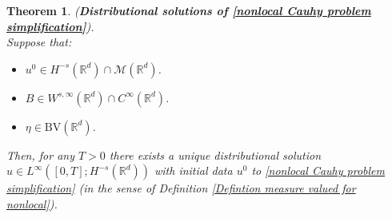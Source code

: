 \documentclass[11pt,reqno]{amsart}
\newtheorem{thm}{Theorem}[section]
\numberwithin{equation}{section}
\begin{document}
\begin{thm}
\textup{(\textbf{Distributional solutions of \eqref{nonlocal Cauhy problem simplification}})}. \\
Suppose that: 
\begin{itemize}
    \item $u^{0}\in H^{-s}(\mathbb{R}^{d})\cap \mathcal{M}(\mathbb{R}^{d})$. 
    \item $B\in W^{s,\infty}(\mathbb{R}^{d})\cap C^{\infty}(\mathbb{R}^{d})$.
    \item $\eta\in \mathrm{BV}(\mathbb{R}^{d})$. 
\end{itemize}
Then, for any $T>0$ there exists a unique distributional solution $u\in L^{\infty}([0,T];H^{-s}(\mathbb{R}^{d}))$ with initial data $u^{0}$ to \eqref{nonlocal Cauhy problem simplification} (in the sense of Definition \ref{Defintion measure valued for nonlocal}). \label{measure valued solutions existence and uniqueness}
\end{thm}
\end{document}
